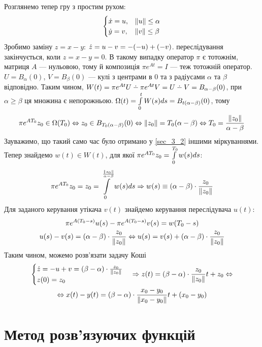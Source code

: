\begin{example}
    Розглянемо тепер гру з простим рухом:
    \begin{gather*}
        \begin{cases}
            \dot{x} = u, & \Vert u \Vert \leq \alpha \\
            \dot{y} = v, & \Vert v \Vert \leq \beta 
        \end{cases}
    \end{gather*}
    Зробимо заміну $z = x - y$: $\dot{z} = u - v = -(-u) + (-v)$.
    переслідування закінчується, коли $z = x - y = 0$.
    В такому випадку оператор $\pi$ є тотожнім, матриця $A$ --- нульовою,
    тому й композиція $\pi e^{At} = I$ --- теж тотожній оператор.
    $U = B_{\alpha}(0)$, $V = B_{\beta}(0)$ --- кулі з центрами в $0$ та з радіусами
    $\alpha$ та $\beta$ відповідно. Таким чином, $W(t) = 
    \pi e^{At} U \setdif \pi e^{A t} V = U \setdif V = B_{\alpha - \beta}(0)$,
    при $\alpha \geq \beta$ ця множина є непорожньою.
    $\Omega(t) = \int\limits_0^t W(s)ds = B_{t(\alpha - \beta)}(0)$, тому
    \begin{gather*}
        \pi e^{AT_0} z_0 \in \Omega(T_0) \Leftrightarrow z_0 \in B_{T_0(\alpha - \beta)}(0) \Leftrightarrow
        \Vert z_0 \Vert = T_0(\alpha - \beta) \Leftrightarrow T_0 = \frac{\Vert z_0 \Vert}{\alpha - \beta}
    \end{gather*}
    Зауважимо, що такий само час було отримано у \ref{sec_3_2} іншими міркуваннями.
    Тепер знайдемо $w(t) \in W(t)$, для якої $\pi e^{A T_0} z_0 = \int\limits_0^{T_0} w(s)ds$:
    \begin{gather*}
        \pi e^{A T_0} z_0 = z_0 = \int\limits_0^{\frac{\Vert z_0 \Vert}{\alpha - \beta}} w(s) ds \Rightarrow
        w(s) \equiv (\alpha - \beta)\cdot \frac{z_0}{\Vert z_0 \Vert}
    \end{gather*}
    Для заданого керування утікача $v(t)$ знайдемо керування переслідувача $u(t)$:
    \begin{gather*}
        \pi e^{A (T_0-s)} u(s) - \pi e^{A (T_0-s)} v(s) = w(T_0 - s) \\
        u(s) - v(s) = (\alpha - \beta)\cdot \frac{z_0}{\Vert z_0 \Vert} \Leftrightarrow
        u(s) = v(s) + (\alpha - \beta)\cdot \frac{z_0}{\Vert z_0 \Vert}
    \end{gather*}
    Таким чином, можемо розв'язати задачу Коші
    \begin{gather*}
        \begin{cases}
            \dot{z} = -u + v = (\beta - \alpha)\cdot \frac{z_0}{\Vert z_0 \Vert} \\
            z(0) = z_0
        \end{cases} \Rightarrow
        z(t) = (\beta - \alpha)\cdot \frac{z_0}{\Vert z_0 \Vert} t + z_0 \Leftrightarrow \\ \Leftrightarrow
        x(t) - y(t) = (\beta - \alpha)\cdot \frac{x_0 - y_0}{\Vert x_0 - y_0 \Vert} t + (x_0 - y_0)
    \end{gather*}
\end{example}

\section{Метод розв'язуючих функцій}

